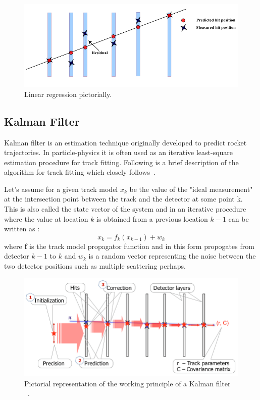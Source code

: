 \begin{figure}[t!]
\centering
\includegraphics[width=\textwidth]{thesis_figures/linear_reg_new.png}
\caption{Linear regression pictorially. }
\label{fig:linear_regression}
\end{figure}

\subsection{Kalman Filter}
Kalman filter is an estimation technique originally developed to predict rocket trajectories. In particle-physics it is often used as an iterative least-square estimation procedure for track fitting. Following is a brief description of the algorithm for track fitting which closely follows~\cite{Fruhwirth:1987fm,Astier:412374}.

Let's assume for a given track model $x_k$ be the value of the "ideal measurement" at the intersection point between the track and the detector at some point k. This is also called the state vector of the system and in an iterative procedure where the value at location $k$ is obtained from a previous location $k-1$ can be written as :
\begin{equation}
  x_k = f_k(x_{k-1}) + w_k
\end{equation}
where \textbf{f} is the track model propagator function and in this form propogates from detector $k-1$ to $k$ and $w_k$ is a random vector representing the noise between the two detector positions such as multiple scattering perhaps.

\begin{figure}[t!]
\centering
\includegraphics[width=\textwidth]{thesis_figures/KALMAN.png}
\caption{Pictorial representation of the working principle of a Kalman filter ~\cite{article_KALMAN}.}
\label{fig:Kalman_filter}
\end{figure}


